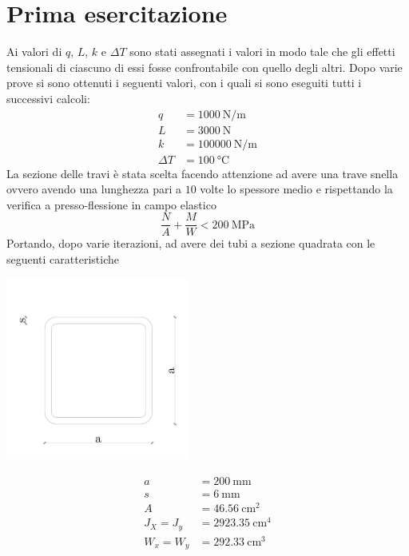 \chapter{Prima esercitazione}

Ai valori di $q$, $L$, $k$ e $\Delta T$ sono stati assegnati i valori in modo tale che gli effetti tensionali di ciascuno di essi fosse confrontabile con quello degli altri. 
Dopo varie prove si sono ottenuti i seguenti valori, con i quali si sono eseguiti tutti i successivi calcoli:
\begin{align*}
	q &= \SI{1000}{\newton \per \metre}\\
	L &= \SI{3000}{\newton}\\
	k &= \SI{100000}{\newton \per \metre}\\
	\Delta T &= \SI{100}{\celsius}
\end{align*}
La sezione delle travi è stata scelta facendo attenzione ad avere una trave snella ovvero avendo una lunghezza pari a $10$ volte lo spessore medio e rispettando la verifica a presso-flessione in campo elastico 
\[
\frac{N}{A} + \frac{M}{W} < \SI{200}{\mega\pascal}
\]
Portando, dopo varie iterazioni, ad avere dei tubi a sezione quadrata con le seguenti caratteristiche
\begin{center}
\begin{minipage}{6cm}
	\includegraphics[width=60mm]{img/tubi-quadri.pdf}
\end{minipage}
\begin{minipage}{6cm}
	\begin{align*}
		a &= \SI{200}{\milli\metre}\\
		s &= \SI{6}{\milli\metre}\\
		A &= \SI{46.56}{\centi\metre\squared}\\
		J_X = J_y &= \SI{2923.35}{\centi\metre\tothe{4}}\\
		W_x = W_y &= \SI{292.33}{\centi\metre\cubed}
	\end{align*}
\end{minipage}
\end{center}

